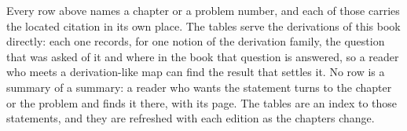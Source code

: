 Every row above names a chapter or a problem number, and each of those carries %
the located citation in its own place. The tables serve the derivations of %
this book directly: each one records, for one notion of the derivation family, %
the question that was asked of it and where in the book that question is %
answered, so a reader who meets a derivation-like map can find the result that %
settles it. %
No row is a summary of a summary: a reader who wants the statement turns to the %
chapter or the problem and finds it there, with its page. %
The tables are an index to those statements, and they are refreshed with each %
edition as the chapters change. %
